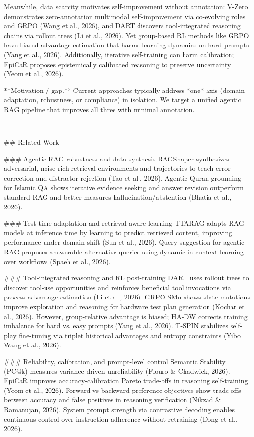 Meanwhile, data scarcity motivates self-improvement without annotation: V-Zero demonstrates zero-annotation multimodal self-improvement via co-evolving roles and GRPO (Wang et al., 2026), and DART discovers tool-integrated reasoning chains via rollout trees (Li et al., 2026). Yet group-based RL methods like GRPO have biased advantage estimation that harms learning dynamics on hard prompts (Yang et al., 2026). Additionally, iterative self-training can harm calibration; EpiCaR proposes epistemically calibrated reasoning to preserve uncertainty (Yeom et al., 2026).  

**Motivation / gap.** Current approaches typically address *one* axis (domain adaptation, robustness, or compliance) in isolation. We target a unified agentic RAG pipeline that improves all three with minimal annotation.

---

## Related Work  

### Agentic RAG robustness and data synthesis  
RAGShaper synthesizes adversarial, noise-rich retrieval environments and trajectories to teach error correction and distractor rejection (Tao et al., 2026). Agentic Quran-grounding for Islamic QA shows iterative evidence seeking and answer revision outperform standard RAG and better measures hallucination/abstention (Bhatia et al., 2026).

### Test-time adaptation and retrieval-aware learning  
TTARAG adapts RAG models at inference time by learning to predict retrieved content, improving performance under domain shift (Sun et al., 2026). Query suggestion for agentic RAG proposes answerable alternative queries using dynamic in-context learning over workflows (Spaeh et al., 2026).

### Tool-integrated reasoning and RL post-training  
DART uses rollout trees to discover tool-use opportunities and reinforces beneficial tool invocations via process advantage estimation (Li et al., 2026). GRPO-SMu shows state mutations improve exploration and reasoning for hardware test plan generation (Kochar et al., 2026). However, group-relative advantage is biased; HA-DW corrects training imbalance for hard vs. easy prompts (Yang et al., 2026). T-SPIN stabilizes self-play fine-tuning via triplet historical advantages and entropy constraints (Yibo Wang et al., 2026).

### Reliability, calibration, and prompt-level control  
Semantic Stability (PC@k) measures variance-driven unreliability (Flouro & Chadwick, 2026). EpiCaR improves accuracy-calibration Pareto trade-offs in reasoning self-training (Yeom et al., 2026). Forward vs backward preference objectives show trade-offs between accuracy and false positives in reasoning verification (Nikzad & Ramanujan, 2026). System prompt strength via contrastive decoding enables continuous control over instruction adherence without retraining (Dong et al., 2026).

